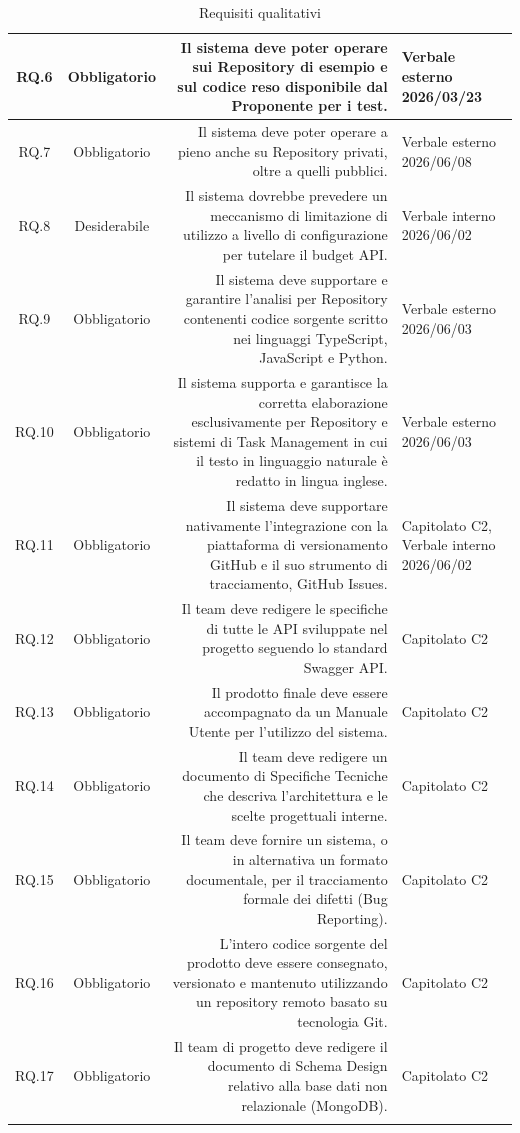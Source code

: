 \documentclass[12pt, a4paper]{article}
\begin{document}
\begin{xltabular}{\textwidth}{|c|c|D|F|}
\hline
RQ.6 & Obbligatorio & Il sistema deve poter operare sui Repository di esempio e sul codice reso disponibile dal Proponente per i test. & Verbale esterno 2026/03/23 \\
\hline
RQ.7 & Obbligatorio & Il sistema deve poter operare a pieno anche su Repository privati, oltre a quelli pubblici. & Verbale esterno 2026/06/08 \\
\hline
RQ.8 & Desiderabile & Il sistema dovrebbe prevedere un meccanismo di limitazione di utilizzo a livello di configurazione per tutelare il budget API. &  Verbale interno 2026/06/02 \\
\hline
RQ.9 & Obbligatorio & Il sistema deve supportare e garantire l'analisi per Repository contenenti codice sorgente scritto nei linguaggi TypeScript, JavaScript e Python. &  Verbale esterno 2026/06/03 \\
\hline
RQ.10 & Obbligatorio & Il sistema supporta e garantisce la corretta elaborazione esclusivamente per Repository e sistemi di Task Management in cui il testo in linguaggio naturale è redatto in lingua inglese. &  Verbale esterno 2026/06/03 \\
\hline
RQ.11 & Obbligatorio & Il sistema deve supportare nativamente l'integrazione con la piattaforma di versionamento GitHub e il suo strumento di tracciamento, GitHub Issues. &  Capitolato C2, Verbale interno 2026/06/02 \\
\hline
RQ.12 & Obbligatorio & Il team deve redigere le specifiche di tutte le API sviluppate nel progetto seguendo lo standard Swagger API. &  Capitolato C2 \\
\hline
RQ.13 & Obbligatorio & Il prodotto finale deve essere accompagnato da un Manuale Utente per l'utilizzo del sistema. &  Capitolato C2 \\
\hline
RQ.14 & Obbligatorio & Il team deve redigere un documento di Specifiche Tecniche che descriva l'architettura e le scelte progettuali interne. &  Capitolato C2 \\
\hline
RQ.15 & Obbligatorio & Il team deve fornire un sistema, o in alternativa un formato documentale, per il tracciamento formale dei difetti (Bug Reporting). &  Capitolato C2 \\
\hline
RQ.16 & Obbligatorio & L'intero codice sorgente del prodotto deve essere consegnato, versionato e mantenuto utilizzando un repository remoto basato su tecnologia Git. &  Capitolato C2 \\
\hline
RQ.17 & Obbligatorio & Il team di progetto deve redigere il documento di Schema Design relativo alla base dati non relazionale (MongoDB). &  Capitolato C2 \\
\hline

    \caption{Requisiti qualitativi}
    \label{tab:rq}
    
\end{xltabular}
\endgroup
\end{document}
